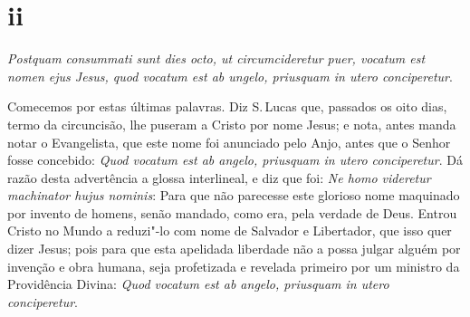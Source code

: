 \section*{ii}

\emph{Postquam consummati sunt dies octo, ut circumcideretur puer,
vocatum est nomen ejus Jesus, quod vocatum est ab ungelo, priusquam in
utero conciperetur}.

Comecemos por estas últimas palavras.
Diz S.\,Lucas que, passados os oito dias, termo da circuncisão, lhe
puseram a Cristo por nome Jesus; e nota, antes manda notar o
Evangelista, que este nome foi anunciado pelo Anjo, antes que o Senhor
fosse concebido: \emph{Quod vocatum est ab angelo, priusquam in utero
conciperetur}. Dá razão desta advertência a glossa interlineal, e diz
que foi: \emph{Ne homo videretur machinator hujus nominis}: Para que
não parecesse este glorioso nome maquinado por invento de homens, senão
mandado, como era, pela verdade de Deus. Entrou Cristo no Mundo a
reduzi"-lo com nome de Salvador e Libertador, que isso quer dizer Jesus;
pois para que esta apelidada liberdade não a possa julgar alguém por
invenção e obra humana, seja profetizada e revelada primeiro por um
ministro da Providência Divina: \emph{Quod vocatum est ab angelo,
priusquam in utero conciperetur}.

